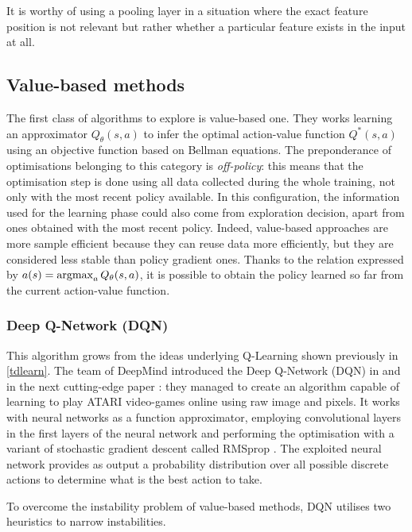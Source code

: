 It is worthy of using a pooling layer in a situation where the exact feature position is not relevant but rather whether a particular feature exists in the input at all.


\subsection{Value-based methods}

The first class of algorithms to explore is value-based one. They works learning an approximator $Q_\theta(s,a)$ to infer the optimal action-value function $Q^*(s,a)$ using an objective function based on Bellman equations.
The preponderance of optimisations belonging to this category is \textit{off-policy}: this means that the optimisation step is done using all data collected during the whole training, not only with the most recent policy available. In this configuration, the information used for the learning phase could also come from exploration decision, apart from ones obtained with the most recent policy.
Indeed, value-based approaches are more sample efficient because they can reuse data more efficiently, but they are considered less stable than policy gradient ones.
Thanks to the relation expressed by $a(s) = \operatornamewithlimits{argmax}_a Q_\theta(s,a)$, it is possible to obtain the policy learned so far from the current action-value function.

\subsubsection{Deep Q-Network (DQN)}
This algorithm grows from the ideas underlying Q-Learning \cite{watkins1989learning}  shown previously in \vref{tdlearn}. The team of DeepMind introduced the Deep Q-Network (DQN) in \cite{mnih2013playing} and in the next cutting-edge paper \cite{mnih2015human}: they managed to create an algorithm capable of learning to play ATARI video-games online using raw image and pixels. It works with neural networks as a function approximator, employing convolutional layers in the first layers of the neural network and performing the optimisation with a variant of stochastic gradient descent called RMSprop \cite{tieleman2012lecture}. The exploited neural network provides as output a probability distribution over all possible discrete actions to determine what is the best action to take.

To overcome the instability problem of value-based methods, DQN utilises two heuristics to narrow instabilities.

